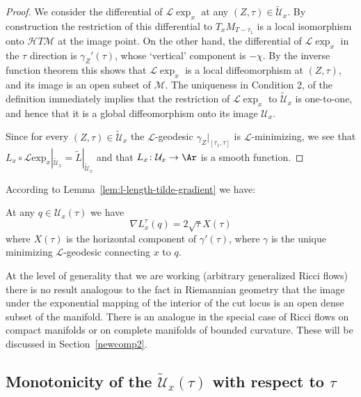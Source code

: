 \begin{proof}
We consider the differential of ${\mathcal L}\exp_x$ at any
 $(Z,\tau)\in\widetilde {\mathcal U}_x$. By construction
 the restriction of this differential to $T_xM_{T-\tau_1}$ is a local
 isomorphism onto ${\mathcal H}T{\mathcal M}$ at the image point. On the other
 hand, the differential of ${\mathcal L}\exp_x$ in the $\tau$
 direction is $\gamma_Z'(\tau)$, whose `vertical' component is
 $-\chi$. By the inverse function theorem this
 shows that ${\mathcal L}\exp_x$ is a local diffeomorphism at
 $(Z,\tau)$, and
 its image is an open subset of ${\mathcal M}$.
The uniqueness in Condition 2, of the definition immediately implies
that the restriction of ${\mathcal L}\exp_x$ to
$\widetilde{\mathcal U}_x$ is one-to-one, and hence that it is a
global diffeomorphism onto its image ${\mathcal U}_x$.

Since for every $(Z,\tau)\in\widetilde{\mathcal U}_x$ the ${\mathcal
L}$-geodesic  $\gamma_Z|_{[\tau_1,\tau]}$ is ${\mathcal
L}$-minimizing, we see that $L_x\circ {\mathcal L}\mathrm{exp}_x|_{\widetilde{\mathcal U}_x}=\widetilde L|_{\widetilde
{\mathcal U}_x}$ and that $L_x\colon {\mathcal U}_x\to \Ar$ is a
smooth function.
\end{proof}

According to Lemma~\ref{lem:l-length-tilde-gradient} we have:

\begin{corollary}\label{cor:l-length-gradient}
\label{DL}
At any $q\in {\mathcal U}_x(\tau)$ we have
$$\nabla L_x^{\tau}(q)=2\sqrt{\tau}X(\tau)$$
where  $X(\tau)$ is the horizontal component of $\gamma'(\tau)$,
where $\gamma$ is the unique minimizing ${\mathcal L}$-geodesic
connecting $x$  to $q$.
\end{corollary}

At the level of generality that we are working (arbitrary
generalized Ricci flows) there is no result analogous to the fact in
Riemannian geometry that the image under the exponential mapping of
the interior of the cut locus is an open dense subset of the
manifold. There is an analogue in the special case of Ricci flows on
compact manifolds or on complete manifolds of bounded curvature.
These will be discussed in Section~\ref{newcomp2}.





\subsection{Monotonicity of the $\widetilde{\mathcal U}_x(\tau)$ with respect to
$\tau$}


